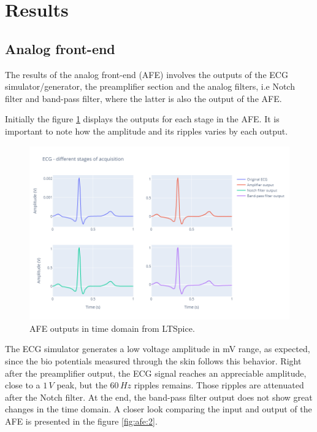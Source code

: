 \section{Results}

\subsection{Analog front-end}

The results of the analog front-end (AFE) involves the outputs of the ECG simulator/generator, the preamplifier section and the analog filters, i.e Notch filter and band-pass filter, where the latter is also the output of the AFE.

Initially the figure \ref{fig:afe:1} displays the outputs for each stage in the AFE. It is important to note how the amplitude and its ripples varies by each output. 

\begin{figure}[h!] 
    \centering
    \includegraphics[width=\textwidth]{images/AFE/afe1.png}
    \caption{AFE outputs in time domain from LTSpice.}
    \label{fig:afe:1}
\end{figure}

The ECG simulator generates a low voltage amplitude in mV range, as expected, since the bio potentials measured through the skin follows this behavior. Right after the preamplifier output, the ECG signal reaches an appreciable amplitude, close to a $1 \, V$ peak, but the $60 \, Hz$ ripples remains. Those ripples are attenuated after the Notch filter. At the end, the band-pass filter output does not show great changes in the time domain. A closer look comparing the input and output of the AFE is presented in the figure \ref{fig:afe:2}.

